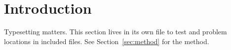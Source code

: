 \section{Introduction}
\label{sec:intro}
Typesetting matters. This section lives in its own file to test \verb|| and
problem locations in included files. See Section~\ref{sec:method} for the method.